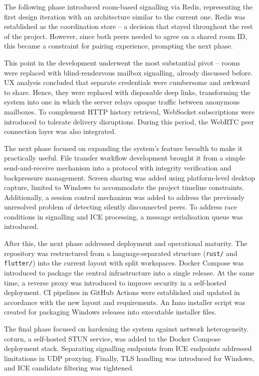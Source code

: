 \documentclass[12pt,a4paper,oneside]{report}
\begin{document}
The following phase introduced room-based signalling via Redis, representing the first design iteration with an architecture similar to the current one. Redis was established as the coordination store -- a decision that stayed throughout the rest of the project. However, since both peers needed to agree on a shared room ID, this became a constraint for pairing experience, prompting the next phase.

This point in the development underwent the most substantial pivot -- rooms were replaced with blind-rendezvous mailbox signalling, already discussed before. UX analysis concluded that separate credentials were cumbersome and awkward to share. Hence, they were replaced with disposable deep links, transforming the system into one in which the server relays opaque traffic between anonymous mailboxes. To complement HTTP history retrieval, WebSocket subscriptions were introduced to tolerate delivery disruptions. During this period, the WebRTC peer connection layer was also integrated.

The next phase focused on expanding the system's feature breadth to make it practically useful. File transfer workflow development brought it from a simple send-and-receive mechanism into a protocol with integrity verification and backpressure management. Screen sharing was added using platform-level desktop capture, limited to Windows to accommodate the project timeline constraints. Additionally, a session control mechanism was added to address the previously unresolved problem of detecting silently disconnected peers. To address race conditions in signalling and ICE processing, a message serialisation queue was introduced.

After this, the next phase addressed deployment and operational maturity. The repository was restructured from a language-separated structure (\texttt{rust/} and \texttt{flutter/}) into the current layout with split workspaces. Docker Compose was introduced to package the central infrastructure into a single release. At the same time, a reverse proxy was introduced to improve security in a self-hosted deployment. CI pipelines in GitHub Actions were established and updated in accordance with the new layout and requirements. An Inno installer script was created for packaging Windows releases into executable installer files.

The final phase focused on hardening the system against network heterogeneity. coturn, a self-hosted STUN service, was added to the Docker Compose deployment stack. Separating signalling endpoints from ICE endpoints addressed limitations in UDP proxying. Finally, TLS handling was introduced for Windows, and ICE candidate filtering was tightened.
\end{document}
